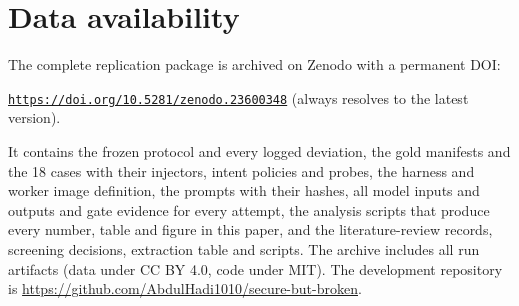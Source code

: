 \documentclass[10pt]{article}
\begin{document}
\section{Data availability}\label{sec:data}
The complete replication package is archived on Zenodo with a permanent DOI:
\begin{center}
\href{https://doi.org/10.5281/zenodo.23600348}{\texttt{https://doi.org/10.5281/zenodo.23600348}}
(always resolves to the latest version).
\end{center}
It contains the frozen protocol and every logged deviation, the gold manifests and the 18 cases
with their injectors, intent policies and probes, the harness and worker image definition, the prompts with their
hashes, all model inputs and outputs and gate evidence for every attempt, the analysis scripts that produce every number,
table and figure in this paper, and the literature-review records, screening decisions, extraction table and scripts.
The archive includes all run artifacts (data under CC BY 4.0, code under MIT). The development repository is
\url{https://github.com/AbdulHadi1010/secure-but-broken}.


\end{document}
